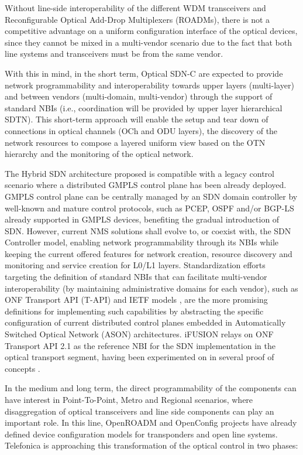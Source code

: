 \documentclass[a4paper,fleqn]{cas-dc}
\begin{document}
Without line-side interoperability of the different WDM transceivers and Reconfigurable Optical Add-Drop Multiplexers (ROADMs), there is not a competitive advantage on a uniform configuration interface of the optical devices, since they cannot be mixed in a multi-vendor scenario due to the fact that both line systems and transceivers must be from the same vendor.

With this in mind, in the short term, Optical SDN-C are expected to provide network programmability and interoperability towards upper layers (multi-layer) and between vendors (multi-domain, multi-vendor) through the support of standard NBIs (i.e., coordination will be provided by upper layer hierarchical SDTN). This short-term approach will enable the setup and tear down of connections in optical channels (OCh and ODU layers), the discovery of the network resources to compose a layered uniform view based on the OTN hierarchy and the monitoring of the optical network.

The Hybrid SDN architecture proposed is compatible with a legacy control scenario where a distributed GMPLS control plane has been already deployed. GMPLS control plane can be centrally managed by an SDN domain controller by well-known and mature control protocols, such as PCEP, OSPF and/or BGP-LS already supported in GMPLS devices, benefiting the gradual introduction of SDN. However, current NMS solutions shall evolve to, or coexist with, the SDN Controller model, enabling network programmability through its NBIs while keeping the current offered features for network creation, resource discovery and monitoring and service creation for L0/L1 layers. Standardization efforts targeting the definition of standard NBIs that can facilitate multi-vendor interoperability (by maintaining administrative domains for each vendor), such as ONF Transport API (T-API) \cite{lopez2016transport} and IETF models \cite{wu2017service}, are the more promising definitions for implementing such capabilities by abstracting the specific configuration of current distributed control planes embedded in Automatically Switched Optical Network (ASON) architectures. 
iFUSION relays on ONF Transport API 2.1 as the reference NBI for the SDN implementation in the optical transport segment, having been experimented on in several proof of concepts \cite{mayoral2016first,mayoral2017control,bravalheri2019vnf}. 

In the medium and long term, the direct programmability of the components can have interest in Point-To-Point, Metro and Regional scenarios, where disaggregation of optical transceivers and line side components can play an important role. In this line, OpenROADM \cite{oda2016learning,kundrat2019opening} and OpenConfig \cite{Openconfig,shaikhopenconfig} projects have already defined device configuration models for transponders and open line systems. Telefonica is approaching this transformation of the optical control in two phases:
\end{document}
